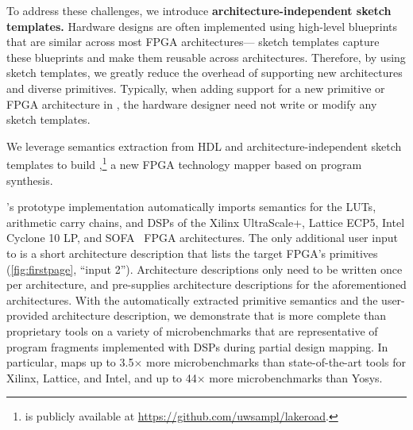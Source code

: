  
To address these challenges, 
  we introduce
  \textbf{architecture-\newline independent sketch templates.}
Hardware designs are often implemented
  using high-level blueprints that are similar 
  across most FPGA architectures---%
  sketch templates
  capture these blueprints
  and make them reusable across architectures.
Therefore, by using sketch templates, we
  greatly reduce the overhead of supporting
  new architectures and
  diverse primitives.
Typically, when adding support for
  a new primitive or FPGA architecture in \lr,
  the hardware designer
  need not write or modify
  any sketch templates.





We leverage
  semantics extraction
  from HDL
  and architecture-independent
  sketch templates
  to build \lr,\footnote{
  \lr is publicly available at
  \url{https://github.com/uwsampl/lakeroad}.
  }
  a new FPGA technology mapper
  based on program synthesis.
  
\lr's prototype implementation automatically
  imports semantics for the LUTs, arithmetic carry chains,
  and DSPs of the Xilinx UltraScale+, Lattice ECP5,
  Intel Cyclone 10 LP,
  and SOFA~\cite{sofa} FPGA architectures. 
The only additional user input to \lr is a short 
  architecture description
  that lists the target FPGA's
  primitives (\cref{fig:firstpage}, ``input 2'').
Architecture descriptions
  only need to be written once per architecture,
  and \lr pre-supplies architecture descriptions
  for the aforementioned architectures.
With the automatically
  extracted primitive semantics
  and the user-provided architecture description,
  we demonstrate that \lr
  is more complete than proprietary tools on a variety
  of microbenchmarks
that are representative of program fragments
  implemented with DSPs during partial design mapping.
In particular,
  \lr maps up to 3.5$\times$ 
  more microbenchmarks than 
  state-of-the-art
  tools for Xilinx, Lattice, and Intel,
  and up to 44$\times$ 
  more microbenchmarks 
  than Yosys.

